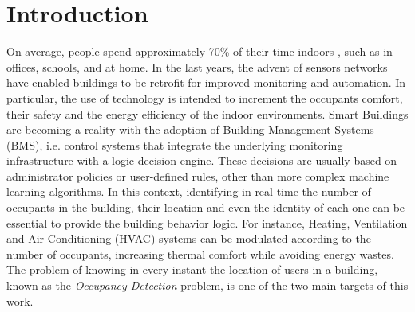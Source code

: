 %
%
\cleardoublepage
%
%
%
\chapter*{Introduction}
%
%
\label{cap:intro}
%
%
On average, people spend approximately 70\% of their time indoors \cite{Roulet2001}, such as in offices, schools, and at home.
In the last years, the advent of sensors networks have enabled buildings to be retrofit for improved monitoring and automation.
In particular, the use of technology is intended to increment the occupants comfort, their safety and the energy efficiency of the indoor environments.
Smart Buildings are becoming a reality with the adoption of Building Management Systems (BMS), i.e. control systems that integrate the underlying monitoring infrastructure with a logic decision engine. These decisions are usually based on administrator policies or user-defined rules, other than more complex machine learning algorithms.
In this context, identifying in real-time the number of occupants in the building, their location and even the identity of each one can be essential to provide the building behavior logic. For instance, Heating, Ventilation and Air Conditioning (HVAC) systems can be modulated according to the number of occupants, increasing thermal comfort while avoiding energy wastes.
The problem of knowing in every instant the location of users in a building, known as the \emph{Occupancy Detection} problem, is one of the two main targets of this work.

